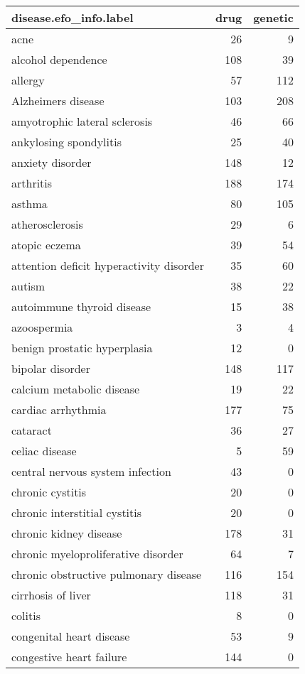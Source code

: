 \begin{table}[ht]
\centering
\begin{tabular}{lrr}
  \hline
disease.efo\_info.label & drug & genetic \\ 
  \hline
acne & 26 & 9 \\ 
  alcohol dependence & 108 & 39 \\ 
  allergy & 57 & 112 \\ 
  Alzheimers disease & 103 & 208 \\ 
  amyotrophic lateral sclerosis & 46 & 66 \\ 
  ankylosing spondylitis & 25 & 40 \\ 
  anxiety disorder & 148 & 12 \\ 
  arthritis & 188 & 174 \\ 
  asthma & 80 & 105 \\ 
  atherosclerosis & 29 & 6 \\ 
  atopic eczema & 39 & 54 \\ 
  attention deficit hyperactivity disorder & 35 & 60 \\ 
  autism & 38 & 22 \\ 
  autoimmune thyroid disease & 15 & 38 \\ 
  azoospermia & 3 & 4 \\ 
  benign prostatic hyperplasia & 12 & 0 \\ 
  bipolar disorder & 148 & 117 \\ 
  calcium metabolic disease & 19 & 22 \\ 
  cardiac arrhythmia & 177 & 75 \\ 
  cataract & 36 & 27 \\ 
  celiac disease & 5 & 59 \\ 
  central nervous system infection & 43 & 0 \\ 
  chronic cystitis & 20 & 0 \\ 
  chronic interstitial cystitis & 20 & 0 \\ 
  chronic kidney disease & 178 & 31 \\ 
  chronic myeloproliferative disorder & 64 & 7 \\ 
  chronic obstructive pulmonary disease & 116 & 154 \\ 
  cirrhosis of liver & 118 & 31 \\ 
  colitis & 8 & 0 \\ 
  congenital heart disease & 53 & 9 \\ 
  congestive heart failure & 144 & 0 \\ 

\end{tabular}
\end{table}
